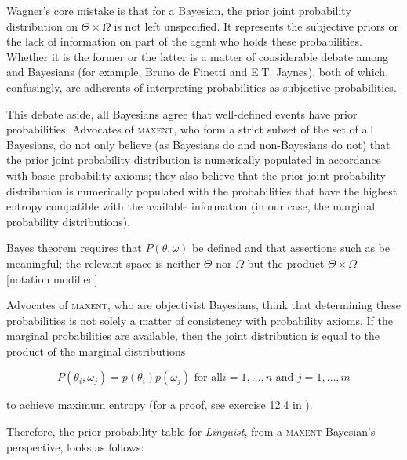 \documentclass[11pt]{article}
\begin{document}
Wagner's core mistake is that for a Bayesian, the prior joint
probability distribution on $\Theta\times\Omega$ is not left
unspecified. It represents the subjective priors or the lack of
information on part of the agent who holds these probabilities.
Whether it is the former or the latter is a matter of considerable
debate among  and  Bayesians
(for example, Bruno de Finetti and E.T. Jaynes), both of which,
confusingly, are adherents of interpreting probabilities as subjective
probabilities. 

This debate aside, all Bayesians agree that well-defined events have
prior probabilities. Advocates of \textsc{maxent}, who form a strict
subset of the set of all Bayesians, do not only believe (as Bayesians
do and non-Bayesians do not) that the prior joint probability
distribution is numerically populated in accordance with basic
probability axioms; they also believe that the prior joint probability
distribution is numerically populated with the probabilities that have
the highest entropy compatible with the available information (in our
case, the marginal probability distributions).

\begin{quotex}
  Bayes theorem requires that $P(\theta,\omega)$ be defined and that
  assertions such as  be
  meaningful; the relevant space is neither $\Theta$ nor $\Omega$ but
  the product $\Theta\times\Omega$ [notation modified]
\end{quotex}

Advocates of \textsc{maxent}, who are objectivist Bayesians, think
that determining these probabilities is not solely a matter of
consistency with probability axioms. If the marginal probabilities are
available, then the joint distribution is equal to the product of the
marginal distributions

\begin{equation}
  \label{eq:prod}
P(\theta_{i},\omega_{j})=p(\theta_{i})p(\omega_{j})\mbox{ for all
}i=1,\ldots,n\mbox{ and }j=1,\ldots,m
\end{equation}

to achieve maximum entropy (for a proof, see exercise 12.4 in
).

Therefore, the prior probability table for \emph{Linguist}, from a
\textsc{maxent} Bayesian's perspective, looks as follows:

\medskip
\end{document}
